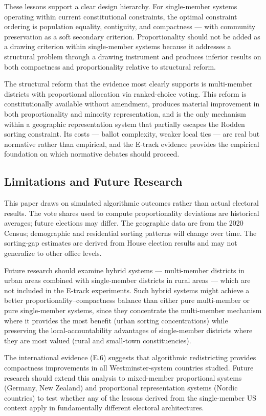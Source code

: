 These lessons support a clear design hierarchy.  For single-member systems
operating within current constitutional constraints, the optimal constraint
ordering is population equality, contiguity, and compactness --- with
community preservation as a soft secondary criterion.  Proportionality should
not be added as a drawing criterion within single-member systems because it
addresses a structural problem through a drawing instrument and produces
inferior results on both compactness and proportionality relative to structural
reform.

The structural reform that the evidence most clearly supports is multi-member
districts with proportional allocation via ranked-choice voting.  This reform
is constitutionally available without amendment, produces material improvement
in both proportionality and minority representation, and is the only mechanism
within a geographic representation system that partially escapes the Rodden
sorting constraint.  Its costs --- ballot complexity, weaker local ties ---
are real but normative rather than empirical, and the E-track evidence provides
the empirical foundation on which normative debates should proceed.

\subsection{Limitations and Future Research}

This paper draws on simulated algorithmic outcomes rather than actual electoral
results.  The vote shares used to compute proportionality deviations are
historical averages; future elections may differ.  The geographic data are from
the 2020 Census; demographic and residential sorting patterns will change over
time.  The sorting-gap estimates are derived from House election results and
may not generalize to other office levels.

Future research should examine hybrid systems --- multi-member districts in
urban areas combined with single-member districts in rural areas --- which are
not included in the E-track experiments.  Such hybrid systems might achieve
a better proportionality--compactness balance than either pure multi-member
or pure single-member systems, since they concentrate the multi-member
mechanism where it provides the most benefit (urban sorting concentrations)
while preserving the local-accountability advantages of single-member districts
where they are most valued (rural and small-town constituencies).

The international evidence (E.6) suggests that algorithmic redistricting
provides compactness improvements in all Westminster-system countries studied.
Future research should extend this analysis to mixed-member proportional
systems (Germany, New Zealand) and proportional representation systems (Nordic
countries) to test whether any of the lessons derived from the single-member
US context apply in fundamentally different electoral architectures.

